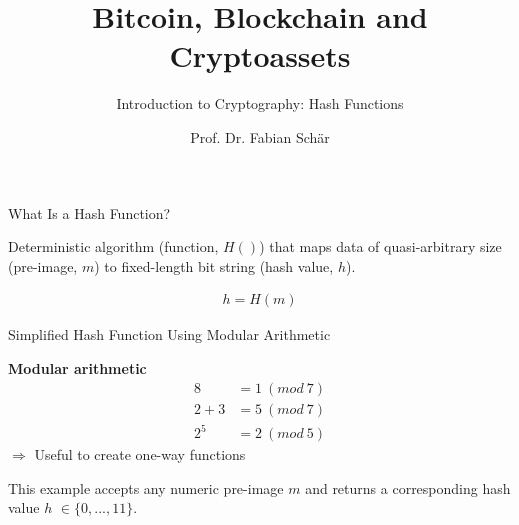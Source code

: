 \documentclass[handout]{beamer}
\title{Bitcoin, Blockchain and Cryptoassets}
\subtitle{Introduction to Cryptography: Hash Functions}
\author{Prof. Dr. Fabian Schär}
\institute{University of Basel}
\begin{document}
\thispagestyle{empty}
\begin{frame}[noframenumbering]
	\titlepage
\end{frame}

\begin{frame}{What Is a Hash Function?}

Deterministic algorithm (\color{focus}function, $H()$\color{black}) that maps data of quasi-arbitrary size (\color{focus}pre-image, $m$\color{black}) to fixed-length bit string (\color{focus}hash value, $h$\color{black}).

	\begin{align}
		h = H(m)
		\label{eq:hash_function}
	\end{align}

\vspace{1.5em}
	
	
\end{frame}


\begin{frame}{Simplified Hash Function Using Modular Arithmetic}
	\begin{minipage}[T]{0.65\textwidth}
	\textbf{Modular arithmetic}
				\begin{align*}
					8 &= 1\ (mod\ 7) \\
					2 + 3 &= 5\ (mod\ 7) \\
					2^5 &= 2\ (mod\ 5)
				\end{align*}
	$\Rightarrow$ Useful to create one-way functions\\
	\end{minipage}
	\hfill
	\begin{minipage}[T]{0.3\textwidth}
		\begin{figure}[h!]
			\centering
			\resizebox{\linewidth}{!}{
			
			}
		\end{figure}
	\end{minipage}



This example accepts any numeric pre-image $m$ and returns a corresponding hash value $h$ $\in \{0,...,11\}$.


\end{frame}
\end{document}
